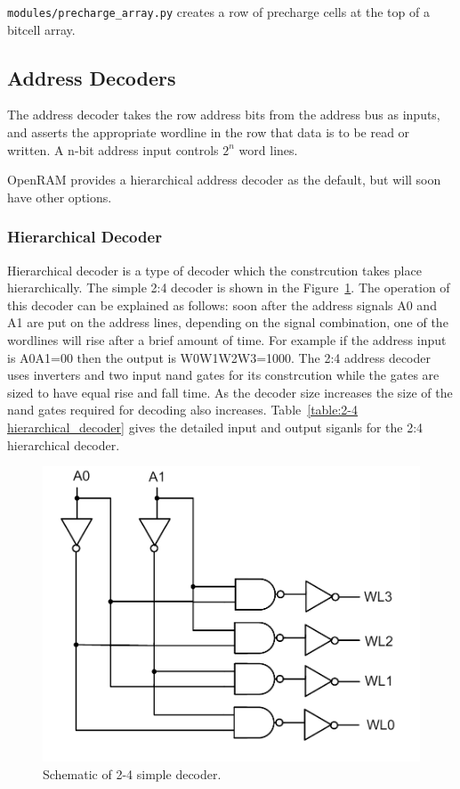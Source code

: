 \verb|modules/precharge_array.py| creates a row of precharge cells at
the top of a bitcell array.




\subsection{Address Decoders}
\label{sec:addressdecoder}

The address decoder takes the row address bits from the address bus as
inputs, and asserts the appropriate wordline in the row that data is
to be read or written.  A n-bit address input controls $2^n$ word
lines. 

OpenRAM provides a hierarchical address decoder as the default, but
will soon have other options.

\subsubsection{Hierarchical Decoder}
\label{sec:hierdecoder}

Hierarchical decoder is a type of decoder which the constrcution takes place hierarchically. 
The simple 2:4 decoder is shown in the Figure~\ref{fig:2 to 4 decoder}. The operation of
this decoder can be explained as follows: soon after the address signals A0 and A1 are put on the address lines, 
depending on the signal combination, one of the wordlines will rise after a brief amount of time. For example if the
address input is A0A1=00 then the output is W0W1W2W3=1000. The 2:4 address decoder uses inverters and two 
input nand gates for its constrcution while the gates are sized to have equal rise and fall time.
As the decoder size increases the size of the nand gates required for decoding also increases.
Table~\ref{table:2-4 hierarchical_decoder} gives the detailed input and output siganls
for the 2:4 hierarchical decoder. 


\begin{figure}[h!]
\centering
\includegraphics[scale=.6]{./figs/2t4decoder.pdf}
\caption{Schematic of 2-4 simple decoder.}
\label{fig:2 to 4 decoder}
\end{figure}

